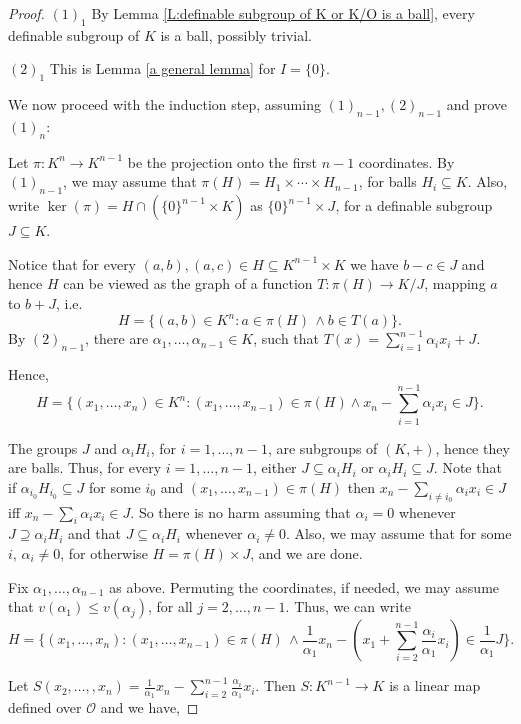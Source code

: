 \documentclass[10pt,a4paper]{amsart}
\def\sub{\subseteq}
\newcommand{\CO}{{\mathcal O}}
\begin{document}
\begin{proof}
$(1)_1$ By Lemma \ref{L:definable subgroup of K or K/O is a ball}, every definable subgroup of $K$ is a ball, possibly trivial.

$(2)_1$ This is  Lemma \ref{a general lemma} for $I=\{0\}$.

We now proceed with the induction step, assuming $(1)_{n-1}, (2)_{n-1}$ and prove $(1)_{n}$: 

Let $\pi:K^n\to K^{n-1}$  be the projection onto the first $n-1$ coordinates. By $(1)_{n-1}$, we may assume that $\pi(H)=H_1\times \cdots \times H_{n-1}$, for balls $H_i\subseteq K$.   Also, write $\ker(\pi)=H\cap (\{0\}^{n-1}\times K)$ as $\{0\}^{n-1}\times J$, for a definable subgroup $J\subseteq K$. 

 Notice that for every $(a,b), (a,c)\in H\sub K^{n-1}\times K$ we have $b-c\in J$ and hence $H$ can be viewed as the graph of a function $T:\pi(H) \to K/J$, mapping $a$ to $b+J$, i.e.
 \[H=\{(a,b)\in K^n:a\in \pi(H)\, \wedge b\in T(a)\}. \]
 By $(2)_{n-1}$, there are $\alpha_1,\ldots, \alpha_{n-1}\in K$, such that $T(x)=\sum_{i=1}^{n-1}\alpha_ix_i+J$.

Hence, 
\[H=\{(x_1,\ldots, x_n)\in K^n: (x_1,\ldots, x_{n-1})\in \pi(H) \wedge x_n-\sum_{i=1}^{n-1} \alpha_i x_i\in J\}. \]
 
 The groups $J$ and $\alpha_iH_i$, for $i=1,\ldots, n-1$, are subgroups of $(K,+)$, hence they are balls. Thus, for every $i=1,\ldots, n-1$,  either $J\sub \alpha_i H_i$ or $\alpha_i H_i\sub J$.  Note that if $\alpha_{i_0} H_{i_0}\sub J$ for some $i_0$  and $(x_1,\dots, x_{n-1})\in \pi(H)$ then $x_n-\sum\limits_{i\neq i_0} \alpha_i x_i\in J$ iff $x_n-\sum\limits_i \alpha_ix_i\in J$.  So there is no harm assuming that $\alpha_i=0$ whenever $J\supseteq \alpha_i H_i$  and that $J\sub \alpha_i H_i$ whenever $\alpha_i\neq 0$. 
Also, we may assume that for some $i$,  $\alpha_i\neq 0$, for otherwise $H=\pi(H)\times J$, and we are done.

Fix $\alpha_1, \dots, \alpha_{n-1}$ as above. Permuting the coordinates, if needed, we may assume that $v(\alpha_1)\leq v(\alpha_j)$, for all $j=2,\ldots, n-1$. Thus, we can write 
\[H=\{(x_1,\ldots, x_n): (x_1,\ldots, x_{n-1})\in \pi(H)\,\wedge \frac{1}{\alpha_1}x_n-(x_1+\sum_{i=2}^{n-1} \frac{\alpha_i}{\alpha_1} x_i)\in \frac{1}{\alpha_1}J\}.\]

Let $S(x_2,\ldots, ,x_n)=\frac{1}{\alpha_1}x_n-\sum_{i=2}^{n-1} \frac{\alpha_i}{\alpha_1}x_i.$ Then $S:K^{n-1}\to K$ is a linear map defined over $\CO$ and we have,


\end{proof}
\end{document}
